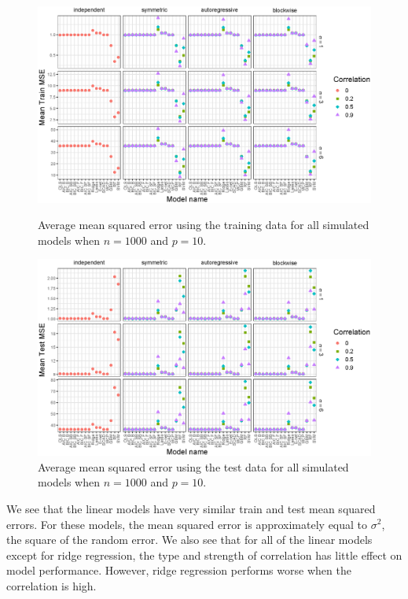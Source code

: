 \documentclass{article}
\begin{document}
\begin{figure}[p!]
	\centering
	\includegraphics[width = \textwidth]{images/facet-train-mse/facet_train_mse_1000_10.eps}
	\caption{Average mean squared error using the training data for all simulated models when $n = 1000$ and $p = 10$.}
	\label{fig:train-mse-1000-10}
	
	\bigskip
	
	\includegraphics[width = \textwidth]{images/facet-test-mse/facet_test_mse_1000_10.eps}
	\caption{Average mean squared error using the test data for all simulated models when $n = 1000$ and $p = 10$.}
	\label{fig:test-mse-1000-10}
\end{figure}

We see that the linear models have very similar train and test mean squared errors. For these models, the mean squared error is approximately equal to $\sigma^2$, the square of the random error. We also see that for all of the linear models except for ridge regression, the type and strength of correlation has little effect on model performance. However, ridge regression performs worse when the correlation is high.
\end{document}
